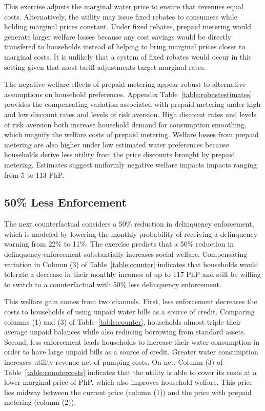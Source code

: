 \documentclass[12pt,table]{article}
\begin{document}
This exercise adjusts the marginal water price to ensure that revenues equal costs.  Alternatively, the utility may issue fixed rebates to consumers while holding marginal prices constant.  Under fixed rebates, prepaid metering would generate larger welfare losses because any cost savings would be directly transfered to households instead of helping to bring marginal prices closer to marginal costs.  It is unlikely that a system of fixed rebates would occur in this setting given that most tariff adjustments target marginal rates.

The negative welfare effects of prepaid metering appear robust to alternative assumptions on household preferences.  Appendix Table~\ref{table:robustestimates} provides the compensating variation associated with prepaid metering under high and low discount rates and levels of risk aversion.  High discount rates and levels of risk aversion both increase household demand for consumption smoothing, which magnify the welfare costs of prepaid metering.  Welfare losses from prepaid metering are also higher under low estimated water preferences because households derive less utility from the price discounts brought by prepaid metering.  Estimates suggest uniformly negative welfare impacts impacts ranging from 5 to 113 PhP.


\subsection{50\% Less Enforcement}
The next counterfactual considers a 50\% reduction in delinquency enforcement, which is modeled by lowering the monthly probability of receiving a delinquency warning from 22\% to 11\%.  The exercise predicts that a 50\% reduction in delinquency enforcement substantially increases social welfare.  Compensating variation in Column (3) of Table~\ref{table:counter} indicates that households would tolerate a decrease in their monthly incomes of up to 117 PhP and still be willing to switch to a counterfactual with 50\% less delinquency enforcement.  

This welfare gain comes from two channels.  First, less enforcement decreases the costs to households of using unpaid water bills as a source of credit.  Comparing columns (1) and (3) of Table~\ref{table:counter}, households almost triple their average unpaid balances while also reducing borrowing from standard assets.  Second, less enforcement leads households to increase their water consumption in order to have large unpaid bills as a source of credit.  Greater water consumption increases utility revenue net of pumping costs.  On net, Column (3) of Table~\ref{table:countercosts} indicates that the utility is able to cover its costs at a lower marginal price of PhP, which also improves household welfare.  This price lies midway between the current price (column (1)) and the price with prepaid metering (column (2)).
\end{document}
